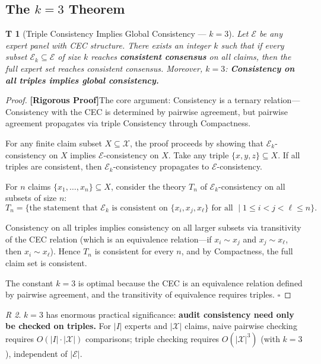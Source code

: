 \documentclass[12pt,a4paper]{article}
\newtheorem{theorem}Theorem[section]
\theoremstyle{remark}
\newtheorem{remark}[theorem]Remark
\newcommand{\ExpertSet}{\mathcal{E}}
\newcommand{\ClaimSpace}{\mathcal{X}}
\newcommand{\rigorous}{\textnormal{\textbf{[Rigorous Proof]}}}
\begin{document}
\subsection{The \(k=3\) Theorem}
\begin{theorem}[Triple Consistency Implies Global Consistency --- \(k=3\)]\label{thm:k3}
Let \(\ExpertSet\) be any expert panel with CEC structure. There exists an integer \(k\) such that if every subset \(\ExpertSet_k \subseteq \ExpertSet\) of size \(k\) reaches \textbf{consistent consensus} on all claims, then the full expert set reaches consistent consensus. Moreover, \(k=3\): \textbf{Consistency on all triples implies global consistency.}
\end{theorem}
\begin{proof}
\rigorous The core argument: Consistency is a ternary relation---Consistency with the CEC is determined by pairwise agreement, but pairwise agreement propagates via triple Consistency through Compactness.

For any finite claim subset \(X \subseteq \ClaimSpace\), the proof proceeds by showing that \(\ExpertSet_k\)-consistency on \(X\) implies \(\ExpertSet\)-consistency on \(X\). Take any triple \(\{x,y,z\} \subseteq X\). If all triples are consistent, then \(\ExpertSet_k\)-consistency propagates to \(\ExpertSet\)-consistency.

For \(n\) claims \(\{x_1,\ldots,x_n\} \subseteq X\), consider the theory \(T_n\) of \(\ExpertSet_k\)-consistency on all subsets of size \(n\):
\begin{equation}
    T_n = \{\text{the statement that } \ExpertSet_k \text{ is consistent on } \{x_i, x_j, x_\ell\} \text{ for all } \mid 1 \leq i < j < \ell \leq n\}.
\end{equation}

Consistency on all triples implies consistency on all larger subsets via transitivity of the CEC relation (which is an equivalence relation---if \(x_i \sim x_j\) and \(x_j \sim x_\ell\), then \(x_i \sim x_\ell\)). Hence \(T_n\) is consistent for every \(n\), and by Compactness, the full claim set is consistent.

The constant \(k=3\) is optimal because the CEC is an equivalence relation defined by pairwise agreement, and the transitivity of equivalence requires triples. \(\square\)
\end{proof}

\begin{remark}
\(k=3\) has enormous practical significance: \textbf{audit consistency need only be checked on triples.} For \(|I|\) experts and \(|\ClaimSpace|\) claims, naive pairwise checking requires \(O(|I| \cdot |\ClaimSpace|)\) comparisons; triple checking requires \(O(|\ClaimSpace|^3)\) (with \(k=3\)), independent of \(|\ExpertSet|\).
\end{remark}
\end{document}
